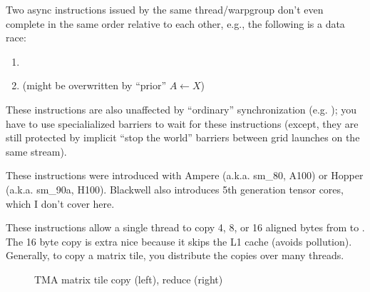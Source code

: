 \filbreak
Two async instructions issued by the same thread/warpgroup don't even complete in the same order relative to each other, e.g., the following is a data race:
\begin{enumerate}
  \item {}
  \item {} (might be overwritten by ``prior'' $A \leftarrow X$)
\end{enumerate}

\filbreak
These instructions are also unaffected by ``ordinary'' synchronization (e.g. );
you have to use specialialized barriers to wait for these instructions
(except, they are still protected by implicit ``stop the world'' barriers between grid launches on the same stream).

\filbreak
{}

These instructions were introduced with Ampere (a.k.a. sm\_80, A100) or Hopper (a.k.a. sm\_90a, H100).
Blackwell also introduces 5th generation tensor cores, which I don't cover here.

\filbreak
{}
These instructions allow a single thread to copy 4, 8, or 16 aligned bytes from  to .
The 16 byte copy is extra nice because it skips the L1 cache (avoids pollution).
Generally, to copy a matrix tile, you distribute the copies over many threads.

\begin{figure*}[!b]
\sffamily
{}
\caption{TMA matrix tile copy (left), reduce (right)} \label{fig:tma}
\end{figure*}

